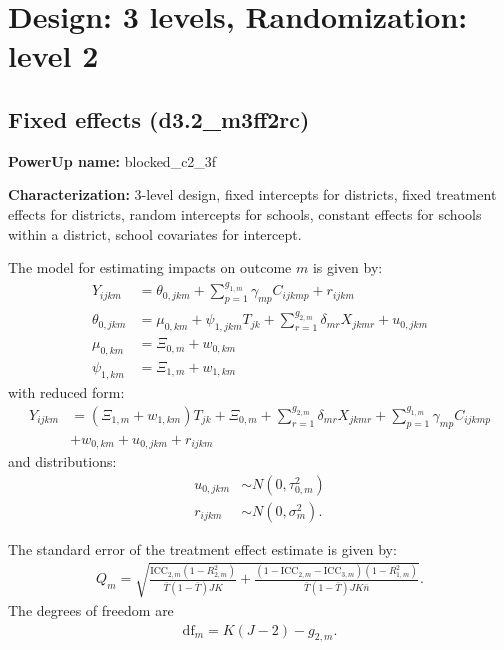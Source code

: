 \documentclass[12pt]{article}
\begin{document}
\section{Design: 3 levels, Randomization: level 2}


\subsection{Fixed effects (d3.2\_m3ff2rc)}

\textbf{PowerUp name:} blocked\_c2\_3f

\textbf{Characterization:} 3-level design, fixed intercepts for districts, fixed treatment effects for districts, random intercepts for schools, constant effects for schools within a district, school covariates for intercept.

The model for estimating impacts on outcome $m$ is given by:
\begin{align}
Y_{ijkm} &=  \theta_{0,jkm} + \sum_{p=1}^{g_{1,m}} \gamma_{mp} C_{ijkmp} + r_{ijkm}\\
\nonumber \theta_{0,jkm} &= \mu_{0,km} + \psi_{1,jkm} T_{jk} + \sum_{r=1}^{g_{2,m}} \delta_{mr} X_{jkmr} + u_{0,jkm}\\
\nonumber \mu_{0,km}  &= \Xi_{0,m}  + w_{0,km}\\
\nonumber \psi_{1,km} &= \Xi_{1,m} + w_{1,km}
\end{align}
with reduced form:
\begin{align}
Y_{ijkm} &= \left(\Xi_{1,m} + w_{1,km} \right) T_{jk} + \Xi_{0,m} + \sum_{r=1}^{g_{2,m}} \delta_{mr} X_{jkmr} + \sum_{p=1}^{g_{1,m}} \gamma_{mp} C_{ijkmp}\\
\nonumber &+ w_{0,km} + u_{0,jkm} + r_{ijkm}
\end{align}
and distributions:
\begin{align}
u_{0,jkm} &\sim N\left(0, \tau^2_{0,m}\right)\\
\nonumber r_{ijkm} &\sim N\left(0, \sigma^2_m\right).
\end{align}

The standard error of the treatment effect estimate is given by:
\begin{align}
Q_m = \sqrt{
\frac{\text{ICC}_{2,m}(1 - R^2_{2,m})}{\bar{T}(1 - \bar{T}) JK} +
\frac{(1-\text{ICC}_{2,m} - \text{ICC}_{3,m})(1-R^2_{1,m})}{\bar{T}(1 - \bar{T}) J K\bar{n}} }.\end{align}
The degrees of freedom are
\begin{align}\text{df}_m = K( J - 2) - g_{2,m}.\end{align}
\end{document}
